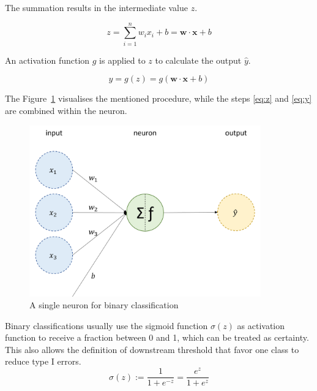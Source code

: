 The summation results in the intermediate value $z$.

\begin{equation} \label{eq:z}
    z = \sum_{i=1}^n w_i x_i + b = \mathbf{w} \cdot \mathbf{x} + b
\end{equation}

An activation function $g$ is applied to $z$ to calculate the output $\hat{y}$.

\begin{equation} \label{eq:y}
\hat{y} = g(z) = g(\mathbf{w} \cdot \mathbf{x} + b)
\end{equation}

The Figure~\ref{fig:neuron} visualises the mentioned procedure, while the steps \ref{eq:z} and \ref{eq:y} are combined within the neuron.

\begin{figure}[H]
    \begin{center}
    \includegraphics[width=10cm]{../images/neuron.png}
    \caption{A single neuron for binary classification}\label{fig:neuron}
    \end{center}
\end{figure}

Binary classifications usually use the sigmoid function $\sigma(z)$ as activation function to receive a fraction between 0 and 1, which can be treated as certainty. This also allows the definition of downstream threshold that favor one class to reduce type I errors.
\begin{equation}
    \sigma(z) := \frac{1}{1+e^{-z}} = \frac{e^{z}}{1+e^{z}}
\end{equation}

